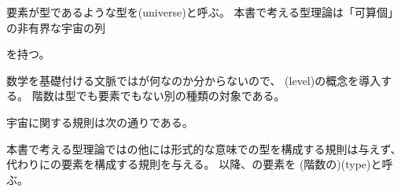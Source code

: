 \documentclass[index]{subfiles}
\begin{document}

要素が型であるような型を(universe)と呼ぶ。
本書で考える型理論は「可算個」の非有界な宇宙の列
\begin{myDisplayMath}
   \myElemOf
   \myElemOf
   \myElemOf
  \myDots
\end{myDisplayMath}
を持つ。

数学を基礎付ける文脈ではが何なのか分からないので、
(level)の概念を導入する。
階数は型でも要素でもない別の種類の対象である。



宇宙に関する規則は次の通りである。




本書で考える型理論ではの他には形式的な意味での型を構成する規則は与えず、
代わりにの要素を構成する規則を与える。
以降、の要素を
(階数の)(type)と呼ぶ。
\end{document}
